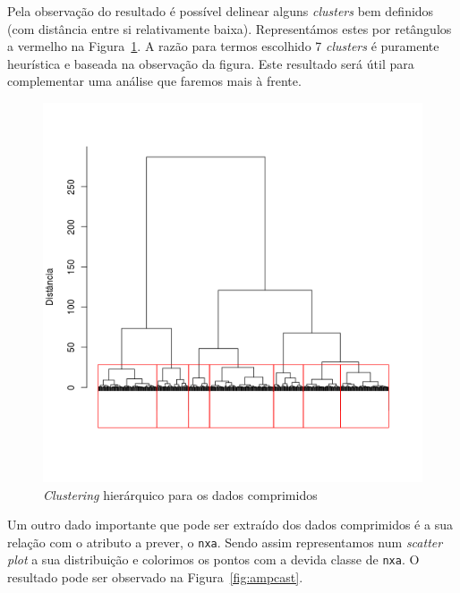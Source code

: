 \documentclass[10pt, conference, compsocconf]{IEEEtran}
\begin{document}
Pela observação do resultado é possível delinear alguns
\textit{clusters} bem definidos (com distância entre si relativamente
baixa). Representámos estes por retângulos a vermelho na
Figura~\ref{fig:ampcahs}. A razão para termos escolhido 7
\textit{clusters} é puramente heurística e baseada na observação da
figura. Este resultado será útil para complementar uma análise que
faremos mais à frente.

\begin{figure}[H]
  \centering
  \includegraphics[scale=0.4]{img/amv_pcahc.png}
  \caption{\textit{Clustering} hierárquico para os dados comprimidos}
  \label{fig:ampcahs}
\end{figure}

Um outro dado importante que pode ser extraído dos dados comprimidos é
a sua relação com o atributo a prever, o {\tt nxa}. Sendo assim
representamos num \textit{scatter plot} a sua distribuição e colorimos
os pontos com a devida classe de {\tt nxa}. O resultado pode ser
observado na Figura~\ref{fig:ampcast}.
\end{document}

